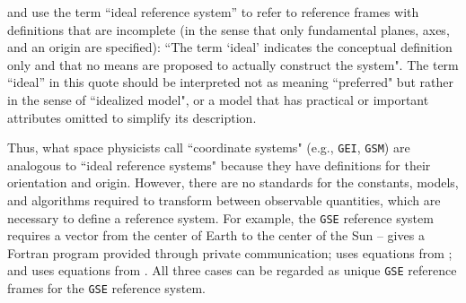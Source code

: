 \documentclass[draft]{agujournal2019}
\begin{document}
 and  use the term ``ideal reference system'' to refer to reference frames with definitions that are incomplete (in the sense that only fundamental planes, axes, and an origin are specified): ``The term `ideal' indicates the conceptual definition only and that no means are proposed to actually construct the system". The term ``ideal'' in this quote should be interpreted not as meaning ``preferred" but rather in the sense of ``idealized model", or a model that has practical or important attributes omitted to simplify its description.



Thus, what space physicists call ``coordinate systems" (e.g., \texttt{GEI}, \texttt{GSM}) are analogous to ``ideal reference systems" because they have definitions for their orientation and origin. However, there are no standards for the constants, models, and algorithms required to transform between observable quantities, which are necessary to define a reference system. For example, the \texttt{GSE} reference system requires a vector from the center of Earth to the center of the Sun --  gives a Fortran program provided through private communication;  uses equations from ; and 
 uses equations from . All three cases can be regarded as unique \texttt{GSE} reference frames for the \texttt{GSE} reference system.
\end{document}
